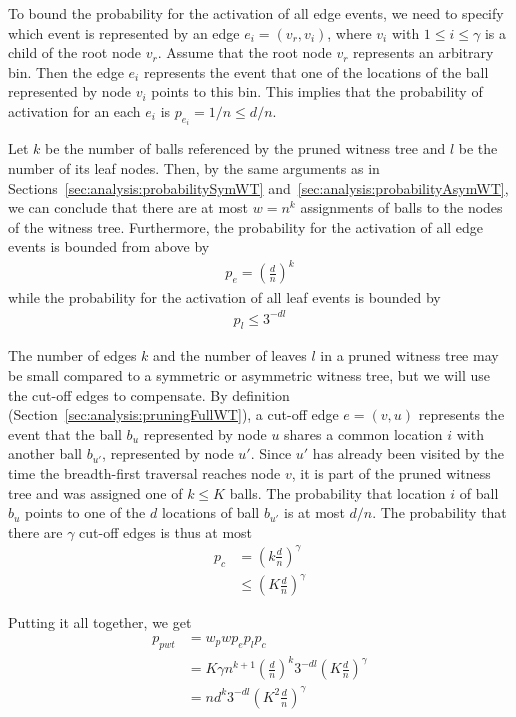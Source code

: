 \documentclass[a4paper,12pt]{article}
\begin{document}
To bound the probability for the activation of all edge events, we need to specify which event is represented by an edge $e_i = (v_r, v_i)$, where $v_i$ with $1 \leq i \leq \gamma$ is a child of the root node $v_r$. Assume that the root node $v_r$ represents an arbitrary bin. Then the edge $e_i$ represents the event that one of the locations of the ball represented by node $v_i$ points to this bin. This implies that the probability of activation for an each $e_i$ is $p_{e_i} = 1/n \leq d/n$. 

Let $k$ be the number of balls referenced by the pruned witness tree and $l$ be the number of its leaf nodes. Then, by the same arguments as in Sections~\ref{sec:analysis:probabilitySymWT} and~\ref{sec:analysis:probabilityAsymWT}, we can conclude that there are at most $w=n^k$ assignments of balls to the nodes of the witness tree. Furthermore, the probability for the activation of all edge events is bounded from above by 
\begin{align*}
p_e = \left(\frac{d}{n}\right)^{k}
\end{align*}
while the probability for the activation of all leaf events is bounded by 
\begin{align*}
p_l \leq 3^{-d l}
\end{align*} 

The number of edges $k$ and the number of leaves $l$ in a pruned witness tree may be small compared to a symmetric or asymmetric witness tree, but we will use the cut-off edges to compensate. By definition (Section~\ref{sec:analysis:pruningFullWT}), a cut-off edge $e=(v, u)$ represents the event that the ball $b_u$ represented by node $u$ shares a common location $i$ with another ball $b_{u'}$, represented by node $u'$. Since $u'$ has already been visited by the time the breadth-first traversal reaches node $v$, it is part of the pruned witness tree and was assigned one of $k\leq K$ balls. The probability that location $i$ of ball $b_u$ points to one of the $d$ locations of ball $b_{u'}$ is at most $d/n$. The probability that there are $\gamma$ cut-off edges is thus at most 
\begin{align*}
p_c &= \left(k \frac{d}{n}\right)^\gamma \\
    & \leq \left(K \frac{d}{n}\right)^\gamma
\end{align*}

Putting it all together, we get 
\begin{align*}
p_{pwt} &= w_p w  p_e  p_l  p_c \\
		&= K\gamma n^{k+1} \left(\frac{d}{n}\right)^k3^{-d l}  \left(K \frac{d}{n}\right)^\gamma\\
		&= n  d^k 3^{-d l}  \left(K^2 \frac{d}{n} \right)^\gamma 
\end{align*}
\end{document}
